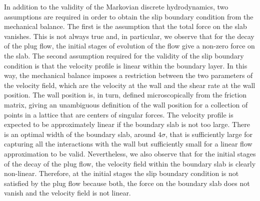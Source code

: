 \documentclass[b5paper,openright,10pt]{book}
\begin{document}
In addition to  the validity of the  Markovian discrete hydrodynamics,
two  assumptions are  required in  order to  obtain the  slip boundary
condition from  the mechanical  balance. The  first is  the assumption
that the  total force on the  slab vanishes.  This is  not always true
and, in  particular, we observe that  for the decay of  the plug flow,
the initial stages  of evolution of the flow give  a non-zero force on
the slab. The second assumption required  for the validity of the slip
boundary condition is  that the velocity profile is  linear within the
boundary  layer.   In  this  way,  the  mechanical  balance  imposes  a
restriction between  the two parameters  of the velocity  field, which
are  the  velocity  at  the  wall  and the  shear  rate  at  the  wall
position. The wall position is,  in turn, defined microscopically from
the  friction matrix,  giving an  unambiguous definition  of the  wall
position for a  collection of points in a lattice  that are centers of
singular forces. The velocity profile is expected to be approximately
linear if  the boundary slab  is not too  large.  There is  an optimal
width of  the boundary  slab, around  $4\sigma$, that  is sufficiently
large  for   capturing  all  the   interactions  with  the   wall  but
sufficiently  small  for a  linear  flow  approximation to  be  valid.
Nevertheless, we also observe that for the initial stages of the decay
of  the plug  flow, the  velocity field  within the  boundary slab  is
clearly non-linear. Therefore, at the initial stages the slip boundary
condition is not satisfied by the plug flow because both, the force on
the  boundary slab  does  not vanish  and the  velocity  field is  not
linear.
\end{document}
